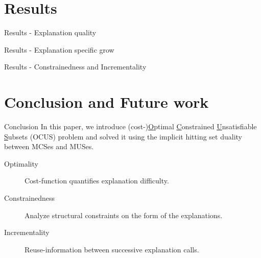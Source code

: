\documentclass{beamer}
\renewcommand\emph[1]{{\color{vuborange}#1}}
\begin{document}
		\section{Results}
		
		\begin{frame}{Results - Explanation quality}
		\end{frame}
		
		\begin{frame}{Results - Explanation specific grow}
			
		\end{frame}
		
		
		\begin{frame}{Results - Constrainedness and Incrementality}
		\end{frame}
		
		
		\section{Conclusion and Future work}
		\begin{frame}{Conclusion}
			In this paper, we introduce (cost-)\emph{\underline{O}ptimal \underline{C}onstrained} \underline{U}nsatisfiable \underline{S}ubsets (OCUS) problem and solved it using the \emph{implicit hitting set duality} between {\color{blue}MCSes} and {\color{teal}MUSes}.
			\vfill
			\begin{description}
				\item[Optimality] Cost-function quantifies explanation difficulty. \pause
				\item[Constrainedness] Analyze structural constraints on the form of the explanations.\pause
				\item[Incrementality] Reuse-information between successive explanation calls.
			\end{description}
			\vfill
		\end{frame}
		
\end{document}
